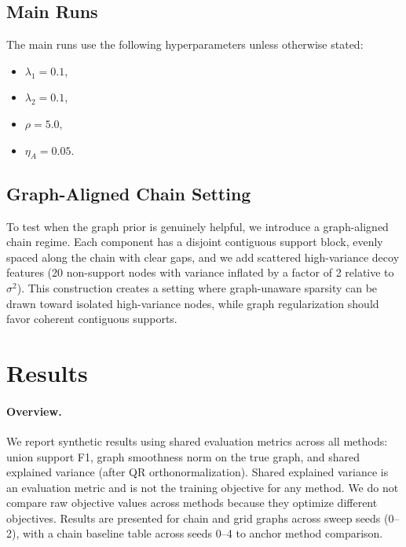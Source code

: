 \documentclass[10pt,twocolumn,letterpaper]{article}
\theoremstyle{definition}
\begin{document}
\subsection{Main Runs}
The main runs use the following hyperparameters unless otherwise stated:
\begin{itemize}[leftmargin=*]
    \item $\lambda_1=0.1$,
    \item $\lambda_2=0.1$,
    \item $\rho=5.0$,
    \item $\eta_A=0.05$.
\end{itemize}

\subsection{Graph-Aligned Chain Setting}
To test when the graph prior is genuinely helpful, we introduce a graph-aligned chain regime. Each component has a disjoint contiguous support block, evenly spaced along the chain with clear gaps, and we add scattered high-variance decoy features (20 non-support nodes with variance inflated by a factor of 2 relative to $\sigma^2$). This construction creates a setting where graph-unaware sparsity can be drawn toward isolated high-variance nodes, while graph regularization should favor coherent contiguous supports.

\section{Results}
\label{sec:results}

\paragraph{Overview.}
We report synthetic results using shared evaluation metrics across all methods: union support F1, graph smoothness norm on the true graph, and shared explained variance (after QR orthonormalization). Shared explained variance is an evaluation metric and is not the training objective for any method. We do not compare raw objective values across methods because they optimize different objectives. Results are presented for chain and grid graphs across sweep seeds (0--2), with a chain baseline table across seeds 0--4 to anchor method comparison.
\end{document}
